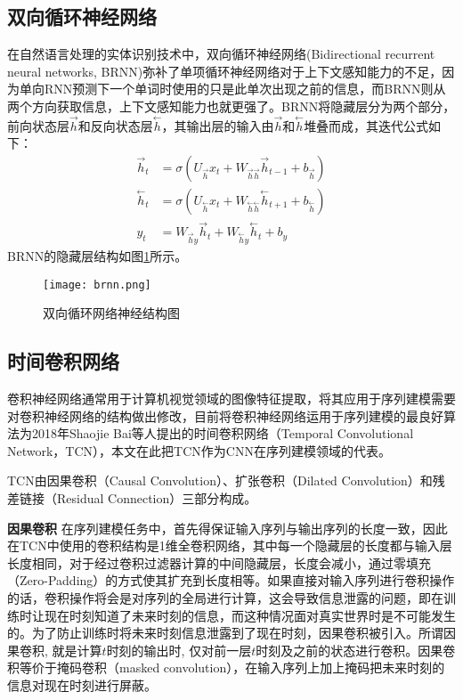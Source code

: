 \subsection{双向循环神经网络}
在自然语言处理的实体识别技术中，双向循环神经网络(Bidirectional recurrent neural networks, BRNN)弥补了单项循环神经网络对于上下文感知能力的不足，因为单向RNN预测下一个单词时使用的只是此单次出现之前的信息，而BRNN则从两个方向获取信息，上下文感知能力也就更强了。BRNN将隐藏层分为两个部分，前向状态层$\stackrel{\rightarrow}{h}$和反向状态层$\stackrel{\leftarrow}{h}$，其输出层的输入由$\stackrel{\rightarrow}{h}$和$\stackrel{\leftarrow}{h}$堆叠而成，其迭代公式如下：
\begin{align} 
  \vec{h}_{t} &= \sigma(U_{\vec{h}} x_{t}+W_{\vec{h} \vec{h}} \vec{h}_{t-1}+b_{\vec{h}}) \label{forword}\\
\stackrel{\leftarrow}{h}_{t} &= \sigma(U_{\stackrel{\leftarrow}{h}} x_{t}+W_{\stackrel{\leftarrow}{h} \stackrel{\leftarrow}{h}} \stackrel{\leftarrow}{h}_{t+1}+b_{\stackrel{\leftarrow}{h}}) \label{backword}\\
y_{t} &= W_{\vec{h} y} \vec{h}_{t}+W_{\stackrel{\leftarrow}{h}y} \stackrel{\leftarrow}{h}_{t}+b_{y} \label{stack}
\end{align}
BRNN的隐藏层结构如图\ref{fig:brnn}所示。
\begin{figure}[htbp]
  \centering
  \texttt{[image: brnn.png]}\\
  \caption{双向循环网络神经结构图}
  \label{fig:brnn}
\end{figure}
\subsection{时间卷积网络}
卷积神经网络通常用于计算机视觉领域的图像特征提取，将其应用于序列建模需要对卷积神经网络的结构做出修改，目前将卷积神经网络运用于序列建模的最良好算法为2018年Shaojie Bai等人提出的时间卷积网络（Temporal Convolutional Network，TCN），本文在此把TCN作为CNN在序列建模领域的代表。

TCN由因果卷积（Causal Convolution）、扩张卷积（Dilated Convolution）和残差链接（Residual Connection）三部分构成。

\textbf{因果卷积}
在序列建模任务中，首先得保证输入序列与输出序列的长度一致，因此在TCN中使用的卷积结构是1维全卷积网络，其中每一个隐藏层的长度都与输入层长度相同，对于经过卷积过滤器计算的中间隐藏层，长度会减小，通过零填充（Zero-Padding）的方式使其扩充到长度相等。如果直接对输入序列进行卷积操作的话，卷积操作将会是对序列的全局进行计算，这会导致信息泄露的问题，即在训练时让现在时刻知道了未来时刻的信息，而这种情况面对真实世界时是不可能发生的。为了防止训练时将未来时刻信息泄露到了现在时刻，因果卷积被引入。所谓因果卷积, 就是计算$t$时刻的输出时, 仅对前一层$t$时刻及之前的状态进行卷积。因果卷积等价于掩码卷积（masked convolution），在输入序列上加上掩码把未来时刻的信息对现在时刻进行屏蔽。

